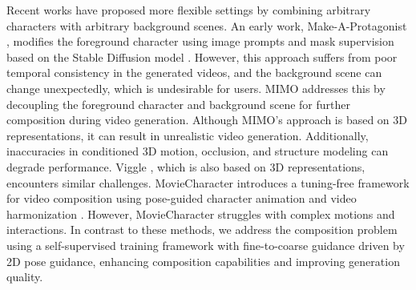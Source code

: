 Recent works have proposed more flexible settings by combining arbitrary characters with arbitrary background scenes. An early work, Make-A-Protagonist \cite{zhao2023make}, modifies the foreground character using image prompts and mask supervision based on the Stable Diffusion model \cite{rombach2022high}. 
However, this approach suffers from poor temporal consistency in the generated videos, and the background scene can change unexpectedly, which is undesirable for users. 
MIMO \cite{men2024mimo} addresses this by decoupling the foreground character and background scene for further composition during video generation. Although MIMO's approach is based on 3D representations, it can result in unrealistic video generation. Additionally, inaccuracies in conditioned 3D motion, occlusion, and structure modeling can degrade performance. 
Viggle \cite{viggle2024}, which is also based on 3D representations, encounters similar challenges.
MovieCharacter \cite{qiu2024moviecharacter} introduces a tuning-free framework for video composition using pose-guided character animation and video harmonization \cite{guerreiro2023pct}. 
However, MovieCharacter struggles with complex motions and interactions. 
In contrast to these methods, we address the composition problem using a self-supervised training framework with fine-to-coarse guidance driven by 2D pose guidance, enhancing composition capabilities and improving generation quality.


